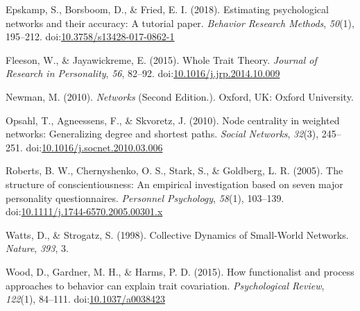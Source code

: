 \documentclass[man]{apa6}
\begin{document}
\hypertarget{ref-epskampEstimatingPsychologicalNetworks2018}{}
Epskamp, S., Borsboom, D., \& Fried, E. I. (2018). Estimating
psychological networks and their accuracy: A tutorial paper.
\emph{Behavior Research Methods}, \emph{50}(1), 195--212.
doi:\href{https://doi.org/10.3758/s13428-017-0862-1}{10.3758/s13428-017-0862-1}

\hypertarget{ref-fleesonWholeTraitTheory2015}{}
Fleeson, W., \& Jayawickreme, E. (2015). Whole Trait Theory.
\emph{Journal of Research in Personality}, \emph{56}, 82--92.
doi:\href{https://doi.org/10.1016/j.jrp.2014.10.009}{10.1016/j.jrp.2014.10.009}

\hypertarget{ref-newmanNetworks2010}{}
Newman, M. (2010). \emph{Networks} (Second Edition.). Oxford, UK: Oxford
University.

\hypertarget{ref-opsahlNodeCentralityWeighted2010}{}
Opsahl, T., Agneessens, F., \& Skvoretz, J. (2010). Node centrality in
weighted networks: Generalizing degree and shortest paths. \emph{Social
Networks}, \emph{32}(3), 245--251.
doi:\href{https://doi.org/10.1016/j.socnet.2010.03.006}{10.1016/j.socnet.2010.03.006}

\hypertarget{ref-robertsStructureConscientiousnessEmpirical2005}{}
Roberts, B. W., Chernyshenko, O. S., Stark, S., \& Goldberg, L. R.
(2005). The structure of conscientiousness: An empirical investigation
based on seven major personality questionnaires. \emph{Personnel
Psychology}, \emph{58}(1), 103--139.
doi:\href{https://doi.org/10.1111/j.1744-6570.2005.00301.x}{10.1111/j.1744-6570.2005.00301.x}

\hypertarget{ref-wattsCollectiveDynamicsSmallWorld1998}{}
Watts, D., \& Strogatz, S. (1998). Collective Dynamics of Small-World
Networks. \emph{Nature}, \emph{393}, 3.

\hypertarget{ref-woodHowFunctionalistProcess2015}{}
Wood, D., Gardner, M. H., \& Harms, P. D. (2015). How functionalist and
process approaches to behavior can explain trait covariation.
\emph{Psychological Review}, \emph{122}(1), 84--111.
doi:\href{https://doi.org/10.1037/a0038423}{10.1037/a0038423}
\end{document}

